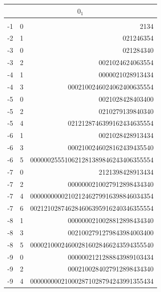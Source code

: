 \documentclass{article}
\begin{document}
\setlength{\tabcolsep}{4pt}
\tiny
{}
\begin{supertabular}[h]{c c r}
\hline
{}                 \\[2pt]
\hline \\[-3pt]
-1    & 0  & 2134                                  \\
-2    & 1  & 021246354                             \\
-3    & 0  & 021284340                             \\
-3    & 2  & 0021024624063554                      \\
-4    & 1  & 0000021028913434                      \\
-4    & 3  & 0002100246024062400635554             \\
-5    & 0  & 0021028428403400                      \\
-5    & 2  & 0210279139840340                      \\
-5    & 4  & 0212128746399162434635554             \\
-6    & 1  & 0021028428913434                      \\
-6    & 3  & 0002100246028162439435540             \\
-6    & 5  & 000000255510621281389846243406355554  \\
-7    & 0  & 2121398428913434                      \\
-7    & 2  & 0000000210027912898434340             \\
-7    & 4  & 000000000021021246279916398846034354  \\
-7    & 6  & 002121028746284606395916240346355554  \\
-8    & 1  & 0000000210028812898434340             \\
-8    & 3  & 0021002791279843984003400             \\
-8    & 5  & 000021000246002816028466243594355540  \\
-9    & 0  & 0000002121288843989103434             \\
-9    & 2  & 0002100284027912898434340             \\
-9    & 4  & 000000000210002871028794243991355434  \\

\end{supertabular}
\end{document}
